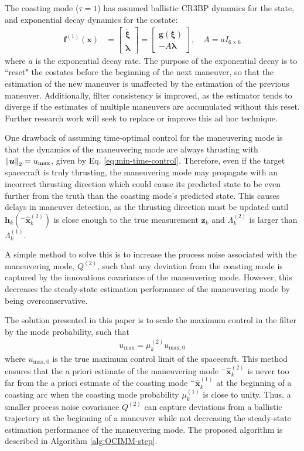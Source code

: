 \documentclass[letterpaper, preprint, paper,11pt]{AAS}	%
\begin{document}
The coasting mode ($\tau=1$) has assumed ballistic CR3BP dynamics for the state, and exponential decay dynamics for the costate:
\begin{align}
    \bm{f}^{(1)}(\bm{x}) &= \begin{bmatrix}
        \dot{\bm{\xi}} \\
        \dot{\bm{\lambda}}
    \end{bmatrix} = \begin{bmatrix}
        \bm{g}(\bm{\xi}) \\
        -A \bm{\lambda}
    \end{bmatrix}, \quad A = aI_{6 \times 6} \label{eq:OCIMM-coasting-dynamics}
\end{align}
\noindent where $a$ is the exponential decay rate. The purpose of the exponential decay is to ``reset" the costates before the beginning of the next maneuver, so that the estimation of the new maneuver is unaffected by the estimation of the previous maneuver. Additionally, filter consistency is improved, as the estimator tends to diverge if the estimates of multiple maneuvers are accumulated without this reset. Further research work will seek to replace or improve this ad hoc technique.

One drawback of assuming time-optimal control for the maneuvering mode is that the dynamics of the maneuvering mode are always thrusting with $\norm{\bm{u}}_2 = u_\text{max}$, given by Eq. \ref{eq:min-time-control}. Therefore, even if the target spacecraft is truly thrusting, the maneuvering mode may propagate with an incorrect thrusting direction which could cause its predicted state to be even further from the truth than the coasting mode's predicted state. This causes delays in maneuver detection, as the thrusting direction must be updated until $\bm{h}_k(^-\hat{\bm{x}}_k^{(2)})$ is close enough to the true measurement $\bm{z}_k$ and $\Lambda_k^{(2)}$ is larger than $\Lambda_k^{(1)}$. 

A simple method to solve this is to increase the process noise associated with the maneuvering mode, $Q^{(2)}$, such that any deviation from the coasting mode is captured by the innovations covariance of the maneuvering mode. However, this decreases the steady-state estimation performance of the maneuvering mode by being overconservative. 

The solution presented in this paper is to scale the maximum control in the filter by the mode probability, such that
\begin{align}
    u_\text{max} = \mu_k^{(2)} u_{\text{max}, 0} \label{eq:umax-scaling}
\end{align}
where $u_{\text{max}, 0}$ is the true maximum control limit of the spacecraft. This method ensures that the a priori estimate of the maneuvering mode $^-\hat{\bm{x}}_k^{(2)}$ is never too far from the a priori estimate of the coasting mode $^-\hat{\bm{x}}_k^{(1)}$ at the beginning of a coasting arc when the coasting mode probability $\mu_k^{(1)}$ is close to unity. Thus, a smaller process noise covariance $Q^{(2)}$ can capture deviations from a ballistic trajectory at the beginning of a maneuver while not decreasing the steady-state estimation performance of the maneuvering mode. The proposed algorithm is described in Algorithm \ref{alg:OCIMM-step}.
\end{document}
